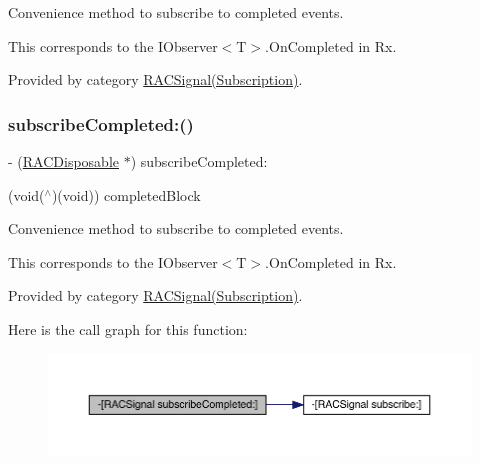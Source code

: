 Convenience method to subscribe to {\ttfamily completed} events.

This corresponds to the {\ttfamily I\+Observer$<$T$>$.On\+Completed} in Rx. 

Provided by category \mbox{\hyperlink{category_r_a_c_signal_07_subscription_08_a3927c94bfca5db9dad133dd7c45563f3}{R\+A\+C\+Signal(\+Subscription)}}.

\mbox{\label{interface_r_a_c_signal_a3927c94bfca5db9dad133dd7c45563f3}} 
\subsubsection{\texorpdfstring{subscribe\+Completed\+:()}{subscribeCompleted:()}\hspace{0.1cm}{\footnotesize\ttfamily [3/3]}}
{\footnotesize\ttfamily -\/ (\mbox{\hyperlink{interface_r_a_c_disposable}{R\+A\+C\+Disposable}} $\ast$) subscribe\+Completed\+: \begin{DoxyParamCaption}\item[{(void($^\wedge$)(void))}]{completed\+Block }\end{DoxyParamCaption}}

Convenience method to subscribe to {\ttfamily completed} events.

This corresponds to the {\ttfamily I\+Observer$<$T$>$.On\+Completed} in Rx. 

Provided by category \mbox{\hyperlink{category_r_a_c_signal_07_subscription_08_a3927c94bfca5db9dad133dd7c45563f3}{R\+A\+C\+Signal(\+Subscription)}}.

Here is the call graph for this function\+:\nopagebreak
\begin{figure}[H]
\begin{center}
\leavevmode
\includegraphics[width=350pt]{interface_r_a_c_signal_a3927c94bfca5db9dad133dd7c45563f3_cgraph}
\end{center}
\end{figure}
\mbox{\label{interface_r_a_c_signal_a6e792da9c8499ad5791e14bd126e99cb}} 
